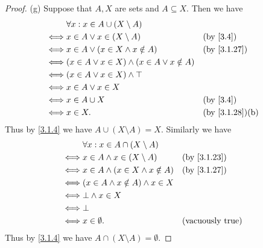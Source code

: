\begin{proof}{(g)}
  Suppose that \(A, X\) are sets and \(A \subseteq X\).
  Then we have
  \begin{align*}
         & \forall x : x \in A \cup (X \setminus A)                                                 \\
    \iff & x \in A \lor x \in (X \setminus A)                     &  & \text{(by \cref{3.4})}       \\
    \iff & x \in A \lor (x \in X \land x \notin A)                &  & \text{(by \cref{3.1.27})}    \\
    \iff & (x \in A \lor x \in X) \land (x \in A \lor x \notin A)                                   \\
    \iff & (x \in A \lor x \in X) \land \top                                                        \\
    \iff & x \in A \lor x \in X                                                                     \\
    \iff & x \in A \cup X                                         &  & \text{(by \cref{3.4})}       \\
    \iff & x \in X.                                               &  & \text{(by \cref{3.1.28})(b)}
  \end{align*}
  Thus by \cref{3.1.4} we have \(A \cup (X \setminus A) = X\).
  Similarly we have
  \begin{align*}
         & \forall x : x \in A \cap (X \setminus A)                                \\
    \iff & x \in A \land x \in (X \setminus A)      &  & \text{(by \cref{3.1.23})} \\
    \iff & x \in A \land (x \in X \land x \notin A) &  & \text{(by \cref{3.1.27})} \\
    \iff & (x \in A \land x \notin A) \land x \in X                                \\
    \iff & \bot \land x \in X                                                      \\
    \iff & \bot                                                                    \\
    \iff & x \in \emptyset.                         &  & \text{(vacuously true)}
  \end{align*}
  Thus by \cref{3.1.4} we have \(A \cap (X \setminus A) = \emptyset\).
\end{proof}

